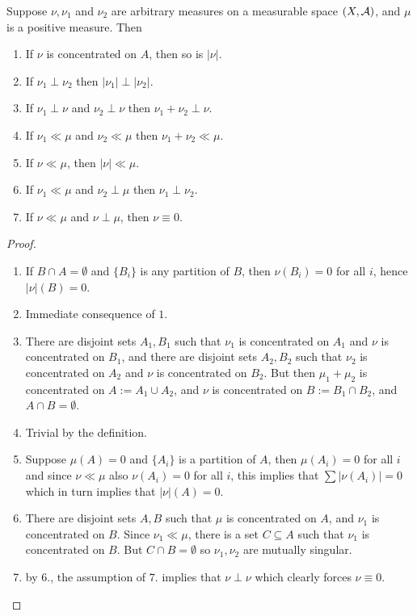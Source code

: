 \documentclass[../../main.tex]{subfiles}
\begin{document}
\begin{proposition}\label{prop: abs cont properties}
Suppose $\nu, \nu_{1}$ and $\nu_{2}$ are arbitrary measures on a measurable space $(X, \mathcal{A})$, and $\mu$ is a positive measure. Then
\begin{enumerate}
\item If $\nu$ is concentrated on $A$, then so is $|\nu|$.
\item If $\nu_{1} \perp \nu_{2}$ then $|\nu_{1}| \perp |\nu_{2}|$.
\item If $\nu_{1} \perp \nu$ and $\nu_{2} \perp \nu$ then $\nu_{1} + \nu_{2} \perp \nu$.
\item If $\nu_{1} \ll \mu$ and $\nu_{2} \ll \mu$ then $\nu_{1} + \nu_{2} \ll \mu$.
\item If $\nu \ll \mu$, then $|\nu|\ll \mu$.
\item If $\nu_{1}\ll \mu$ and $\nu_{2} \perp \mu$ then $\nu_{1} \perp \nu_{2}$.
\item If $\nu \ll \mu$ and $\nu \perp \mu$, then $\nu \equiv 0$.
\end{enumerate}
\end{proposition}
\begin{proof}
\begin{enumerate}
\item If $B\cap A=\emptyset$ and $\{B_{i}\}$ is any partition of $B$, then $\nu(B_{i})=0$ for all $i$, hence $|\nu|(B)=0$.
\item Immediate consequence of $1.$
\item There are disjoint sets $A_{1},B_{1}$ such that $\nu_{1}$ is concentrated on $A_{1}$ and $\nu$ is concentrated on $B_{1}$, and there are disjoint sets $A_{2},B_{2}$ such that $\nu_{2}$ is concentrated on $A_{2}$ and $\nu$ is concentrated on $B_{2}$. But then $\mu_{1}+\mu_{2}$ is concentrated on $A:=A_{1} \cup A_{2}$, and $\nu$ is concentrated on $B:=B_{1} \cap B_{2}$, and $A\cap B= \emptyset$.
\item Trivial by the definition.
\item Suppose $\mu(A)=0$ and $\{A_{i}\}$ is a partition of $A$, then $\mu(A_{i})=0$ for all $i$ and since $\nu\ll \mu$ also $\nu(A_{i})=0$ for all $i$, this implies that $\sum|\nu(A_{i})|=0$ which in turn implies that $|\nu|(A)=0$.
\item There are disjoint sets $A, B$ such that $\mu$ is concentrated on $A$, and $\nu_{1}$ is concentrated on $B$. Since $\nu_{1} \ll \mu$, there is a set $C\subseteq A$ such that $\nu_{1}$ is concentrated on $B$. But $C\cap B=\emptyset$ so $\nu_{1}, \nu_{2}$ are mutually singular.
\item by $6.$, the assumption of $7.$ implies that $\nu \perp \nu$ which clearly forces $\nu \equiv 0$.
\end{enumerate}
\end{proof}
\end{document}
